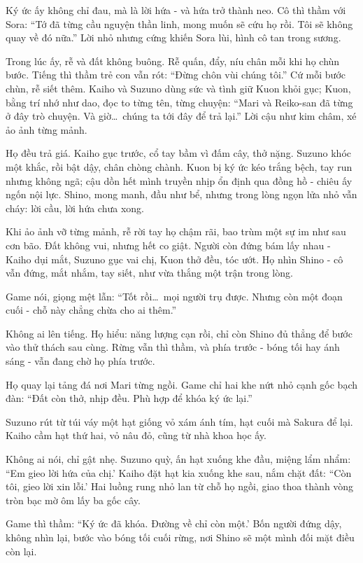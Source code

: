 \documentclass[../main.tex]{subfiles}
\begin{document}
Ký ức ấy không chỉ đau, mà là lời hứa - và hứa trở thành neo. Cô thì thầm với Sora: ``Tớ đã từng cầu nguyện thần linh, mong muốn sẽ cứu họ rồi. Tôi sẽ không quay về đó nữa.'' Lời nhỏ nhưng cứng khiến Sora lùi, hình cô tan trong sương.

Trong lúc ấy, rễ và đất không buông. Rễ quấn, đẩy, níu chân mỗi khi họ chùn bước. Tiếng thì thầm trẻ con vẫn rót: ``Đừng chôn vùi chúng tôi.'' Cứ mỗi bước chùn, rễ siết thêm. Kaiho và Suzuno dùng sức và tình giữ Kuon khỏi gục; Kuon, bằng trí nhớ như dao, đọc to từng tên, từng chuyện: ``Mari và Reiko-san đã từng ở đây trò chuyện. Và giờ\dots\ chúng ta tới đây để trả lại.'' Lời cậu như kim châm, xé ảo ảnh từng mảnh.

Họ đều trả giá. Kaiho gục trước, cổ tay bầm vì đấm cây, thở nặng. Suzuno khóc một khắc, rồi bật dậy, chân chòng chành. Kuon bị ký ức kéo trắng bệch, tay run nhưng không ngã; cậu dồn hết mình truyền nhịp ổn định qua đồng hồ - chiêu ấy ngốn nội lực. Shino, mong manh, đầu như bể, nhưng trong lòng ngọn lửa nhỏ vẫn cháy: lời cầu, lời hứa chưa xong.

Khi ảo ảnh vỡ từng mảnh, rễ rời tay họ chậm rãi, bao trùm một sự im như sau cơn bão. Đất không vui, nhưng hết co giật. Người còn đứng bám lấy nhau - Kaiho dụi mắt, Suzuno gục vai chị, Kuon thở đều, tóc ướt. Họ nhìn Shino - cô vẫn đứng, mắt nhắm, tay siết, như vừa thắng một trận trong lòng.

Game nói, giọng mệt lẫn: ``Tốt rồi\dots\ mọi người trụ được. Nhưng còn một đoạn cuối - chỗ này chẳng chừa cho ai thêm.''

Không ai lên tiếng. Họ hiểu: năng lượng cạn rồi, chỉ còn Shino đủ thẳng để bước vào thử thách sau cùng. Rừng vẫn thì thầm, và phía trước - bóng tối hay ánh sáng - vẫn đang chờ họ phía trước.

Họ quay lại tảng đá nơi Mari từng ngồi. Game chỉ hai khe nứt nhỏ cạnh gốc bạch đàn: ``Đất còn thở, nhịp đều. Phù hợp để khóa ký ức lại.''

Suzuno rút từ túi váy một hạt giống vỏ xám ánh tím, hạt cuối mà Sakura để lại. Kaiho cầm hạt thứ hai, vỏ nâu đỏ, cũng từ nhà khoa học ấy.

Không ai nói, chỉ gật nhẹ. Suzuno quỳ, ấn hạt xuống khe đầu, miệng lẩm nhẩm: ``Em gieo lời hứa của chị.' Kaiho đặt hạt kia xuống khe sau, nắm chặt đất: ``Còn tôi, gieo lời xin lỗi.' Hai luồng rung nhỏ lan từ chỗ họ ngồi, giao thoa thành vòng tròn bạc mờ ôm lấy ba gốc cây.

Game thì thầm: ``Ký ức đã khóa. Đường về chỉ còn một.' Bốn người đứng dậy, không nhìn lại, bước vào bóng tối cuối rừng, nơi Shino sẽ một mình đối mặt điều còn lại.
\end{document}
